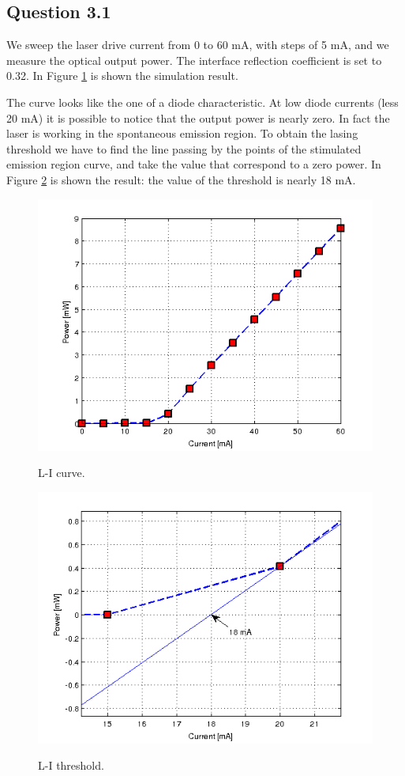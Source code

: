 \documentclass[a4paper,10pt]{report}
\begin{document}
\subsection*{Question 3.1}
We sweep the laser drive current from 0 to 60 mA, with steps of 5 mA, and we measure the optical output power.
The interface reflection coefficient is set to 0.32.
In Figure \ref{Tx1_31} is shown the simulation result.

The curve looks like the one of a diode characteristic.
At low diode currents (less 20 mA) it is possible to notice that the output power is nearly zero.
In fact the laser is working in the spontaneous emission region.
To obtain the lasing threshold we have to find the line passing by the points of the stimulated emission region curve,
and take the value that correspond to a zero power.
In Figure \ref{Tx1_32} is shown the result: the value of the threshold is nearly 18 mA.

\begin{figure}[!ht]
  \centering
  \includegraphics[width=12cm]{Tx1_31.png}\\
  \caption{L-I curve.}
  \label{Tx1_31}
\end{figure}

\begin{figure}[!ht]
  \centering
  \includegraphics[width=12cm]{Tx1_32.png}\\
  \caption{L-I threshold.}
  \label{Tx1_32}
\end{figure}
\end{document}
